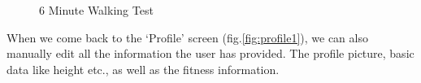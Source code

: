\begin{figure}[h!]
    \centering
    \hfill
    \caption{6 Minute Walking Test}
    \label{fig:6mwt}
\end{figure}

When we come back to the `Profile' screen (fig.\ref{fig:profile1}), we can also manually edit all the information the user has provided.
The profile picture, basic data like height etc., as well as the fitness information.

